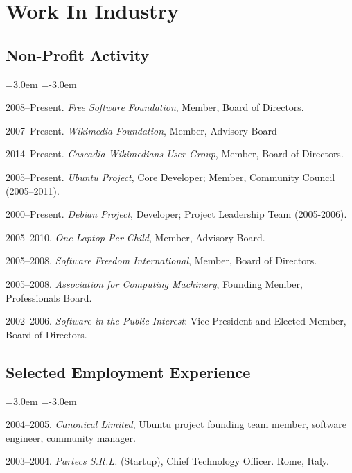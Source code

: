 \documentclass[10pt]{article}
\newenvironment{cvlist}{
\begin{list}{}{\leftmargin=3.0em \itemindent=-3.0em}
  \setlength{\itemsep}{0pt}
  \setlength{\parskip}{0em}
  \setlength{\parsep}{1em}
  \setlength{\parindent}{0em}}
{\vspace{1em}
\end{list}}
\begin{document}
\section{Work In Industry}

\subsection{Non-Profit Activity}
\begin{cvlist}
\item 2008--Present. \emph{Free Software Foundation}, Member, Board of Directors.
\item 2007--Present. \emph{Wikimedia Foundation}, Member, Advisory Board
\item 2014--Present. \emph{Cascadia Wikimedians User Group}, Member, Board of Directors.
\item 2005--Present. \emph{Ubuntu Project}, Core Developer; Member, Community Council (2005--2011).
\item 2000--Present. \emph{Debian Project}, Developer; Project Leadership Team (2005-2006).
\item 2005--2010. \emph{One Laptop Per Child}, Member, Advisory Board. %
\item 2005--2008. \emph{Software Freedom International}, Member, Board of Directors.
\item 2005--2008. \emph{Association for Computing Machinery}, Founding Member, Professionals Board.
\item 2002--2006. \emph{Software in the Public Interest}: Vice President and Elected Member, Board of Directors.
\end{cvlist}

\subsection{Selected Employment Experience}
\begin{cvlist}
\item 2004--2005. \emph{Canonical Limited}, Ubuntu project founding team member, software engineer, community manager.
\item 2003--2004. \emph{Partecs S.R.L.} (Startup), Chief Technology Officer. Rome, Italy.
\end{cvlist}
\end{document}
